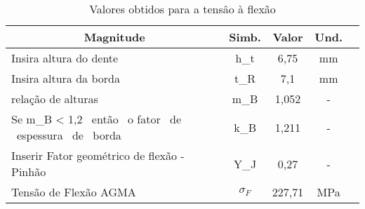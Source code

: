 \begin{table}
\centering
\caption{\label{tab:5} Valores obtidos para a tensâo à flexão}
\begin{tabular}{l c c c c}
\hline
\multicolumn{1}{c}{\textbf{Magnitude}}           & \textbf{Simb.} & \textbf{Valor} & \textbf{Und.} \\ \hline
Insira altura do dente                           & h_t             & 6,75           & mm            \\
Insira altura da borda                           & t_R             & 7,1            & mm            \\
relação de alturas                               & m_B             & 1,052          & -             \\
Se m_B < 1,2 \ então \ o fator \ de \ espessura \ de \ borda & k_B             & 1,211          & -             \\
Inserir Fator geométrico de flexão - Pinhão      & Y_J             & 0,27           & -             \\
Tensão de Flexão AGMA                            & $\sigma_F$       & 227,71         & MPa     \\ \hline     
\end{tabular}
\end{table}